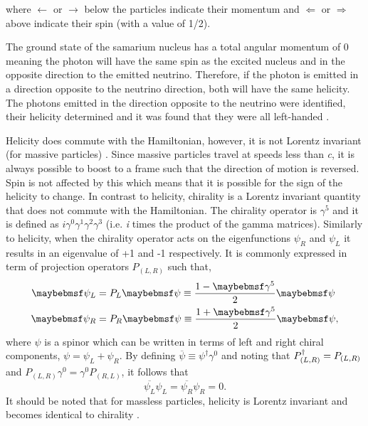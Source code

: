 where $\longleftarrow$ or $\longrightarrow$ below the particles indicate their momentum and $\Leftarrow$ or $\Rightarrow$ above indicate their spin (with a value of 1/2).

The ground state of the samarium nucleus has a total angular momentum of 0 meaning the photon will have the same spin as the excited nucleus and in the opposite direction to the emitted neutrino. Therefore, if the photon is emitted in a direction opposite to the neutrino direction, both will have the same helicity. The photons emitted in the direction opposite to the neutrino were identified, their helicity determined and it was found that they were all left-handed \cite{Goldhaber_experiment}. 

Helicity does commute with the Hamiltonian, however, it is not Lorentz invariant (for massive particles) \cite{Introduction_to_Particle_and_Astroparticle_Physics_book}. Since massive particles travel at speeds less than \textit{c}, it is always possible to boost to a frame such that the direction of motion is reversed. Spin is not affected by this which means that it is possible for the sign of the helicity to change. In contrast to helicity, chirality is a Lorentz invariant quantity that does not commute with the Hamiltonian. The chirality operator is $\gamma^5$ and it is defined as $i\gamma^0\gamma^1\gamma^2\gamma^3$ (i.e. \textit{i} times the product of the gamma matrices). Similarly to helicity, when the chirality operator acts on the eigenfunctions $\psi_R$ and $\psi_L$ it results in an eigenvalue of +1 and -1 respectively. It is commonly expressed in term of projection operators $P_{(L, R)}$ such that,
\begin{equation}
\begin{split}
    \psi_L &= P_L\psi \isdefined \frac{1-\gamma^5}{2}\psi \\
    \psi_R &= P_R\psi \isdefined \frac{1+\gamma^5}{2}\psi,
\end{split}
\end{equation}
where $\psi$ is a spinor which can be written in terms of left and right chiral components, $\psi = \psi_L + \psi_R$.
By defining $\overline{\psi} \equiv \psi^\dag \gamma^0$ and noting that $P_{(L,R)}^\dagger = P_{(L,R)}$ and $P_{(L,R)}\gamma^0 = \gamma^0P_{(R,L)}$, it follows that
\begin{equation}\label{eqn:chiral identity}
    \overline{\psi_L}\psi_L = \overline{\psi_R}\psi_R = 0.
\end{equation}
It should be noted that for massless particles, helicity is Lorentz invariant and becomes identical to chirality \cite{Fundamentals_of_Neutrino_Physics_and_Astrophysics}.


